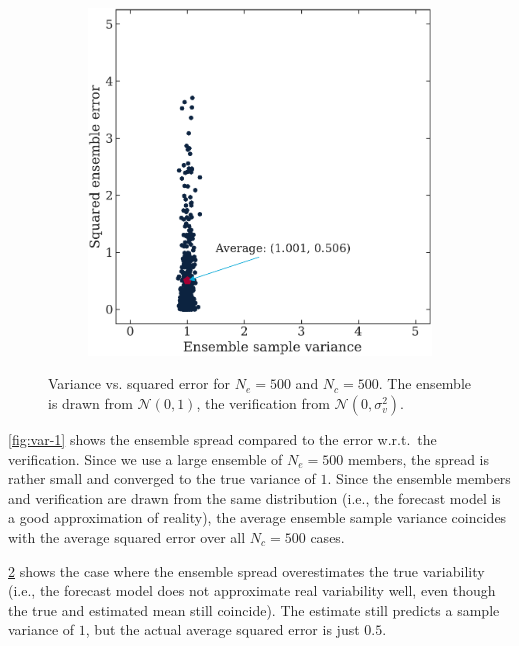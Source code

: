 \documentclass[parskip=half,DIV=12,bookmarkpackage=false]{scrartcl}
\begin{document}
\begin{figure}[ht]
\begin{subfigure}[c]{0.49\textwidth}
        \includegraphics[width=\textwidth]{figures/var_vs_err_0.50.pdf}
        \label{fig:var-05}
    \end{subfigure}
 
    \caption{Variance vs. squared error for $N_e = 500$ and $N_c = 500$. The ensemble is drawn from $\mathcal{N}(0, 1)$, the verification from $\mathcal{N}(0, \sigma_v^2)$.}
 \end{figure}


 \cref{fig:var-1} shows the ensemble spread compared to the error w.r.t.\ the verification. Since we use a large ensemble of $N_e = 500$ members, the spread is rather small and converged to the true variance of $1$. Since the ensemble members and verification are drawn from the same distribution (i.e., the forecast model is a good approximation of reality), the average ensemble sample variance coincides with the average squared error over all $N_c = 500$ cases.

 \cref{fig:var-05} shows the case where the ensemble spread overestimates the true variability (i.e., the forecast model does not approximate real variability well, even though the true and estimated mean still coincide). The estimate still predicts a sample variance of $1$, but the actual average squared error is just $0.5$.
\end{document}
